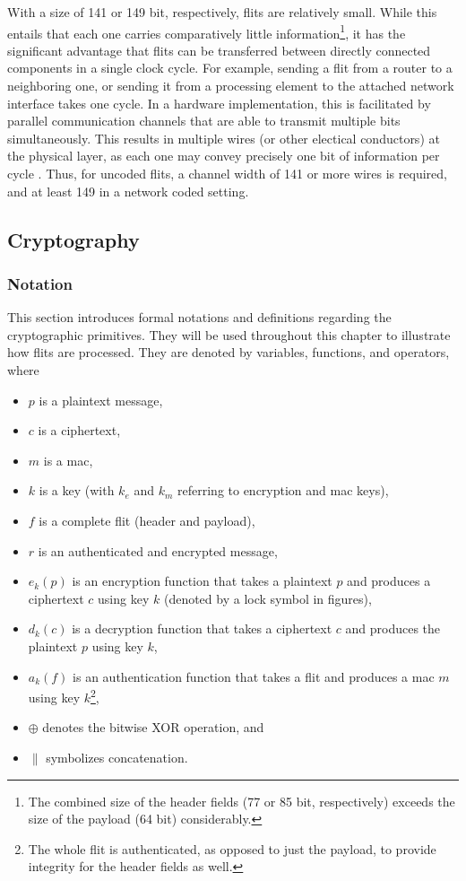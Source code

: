 With a size of 141 or 149 bit, respectively, flits are relatively small. While this entails that each one carries comparatively little
information\footnote{The combined size of the header fields (77 or 85 bit, respectively) exceeds the size of the payload (64 bit) considerably.}, it
has the significant advantage that flits can be transferred between directly connected components in a single clock
cycle. For example, sending a flit from a router to a neighboring one, or sending it from a processing element
to the attached network interface takes one cycle. In a hardware implementation, this is facilitated by parallel communication channels that are able
to transmit multiple bits simultaneously. This results in multiple wires (or other electical conductors) at the physical layer, as each one may convey
precisely one bit of information per cycle \cite{encyclopediaparallelcomm}. Thus, for uncoded flits, a channel width of 141 or more wires is required,
and at least 149 in a network coded setting.

\subsection{Cryptography}\label{subsec:crypto}
\subsubsection{Notation}\label{subsubsec:cryptonotation}
This section introduces formal notations and definitions regarding the cryptographic primitives. They will be used throughout this chapter to
illustrate how flits are processed. They are denoted by variables, functions, and operators, where
\begin{itemize}
    \item $p$ is a plaintext message,
    \item $c$ is a ciphertext,
    \item $m$ is a \gls{mac},
    \item $k$ is a key (with $k_e$ and $k_m$ referring to encryption and \gls{mac} keys),
    \item $f$ is a complete flit (header and payload),
    \item $r$ is an authenticated and encrypted message,
    \item $e_k(p)$ is an encryption function that takes a plaintext $p$ and produces a ciphertext $c$ using key $k$ (denoted by a lock
        symbol in figures),
    \item $d_k(c)$ is a decryption function that takes a ciphertext $c$ and produces the plaintext $p$ using key $k$,
    \item $a_k(f)$ is an authentication function that takes a flit and produces a \gls{mac} $m$ using key $k$\footnote{The whole flit is
        authenticated, as opposed to just the payload, to provide integrity for the header fields as well.},
    \item $\oplus$ denotes the bitwise XOR operation, and
    \item $\|$ symbolizes concatenation.
\end{itemize}
\vspace{0.5\baselineskip}

